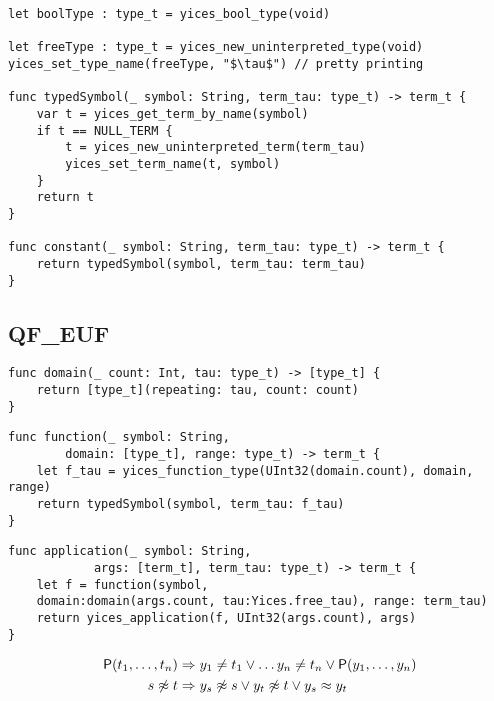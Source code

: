 \begin{lstlisting}[language=flea, caption={Yices types, symbols, and constants}]
let boolType : type_t = yices_bool_type(void)

let freeType : type_t = yices_new_uninterpreted_type(void)
yices_set_type_name(freeType, "$\tau$") // pretty printing

func typedSymbol(_ symbol: String, term_tau: type_t) -> term_t {
	var t = yices_get_term_by_name(symbol)
	if t == NULL_TERM {
		t = yices_new_uninterpreted_term(term_tau)
		yices_set_term_name(t, symbol)
	}
	return t
}

func constant(_ symbol: String, term_tau: type_t) -> term_t {
	return typedSymbol(symbol, term_tau: term_tau)
}
\end{lstlisting}




\subsection{QF\_EUF}

\begin{lstlisting}[language=flea]
func domain(_ count: Int, tau: type_t) -> [type_t] {
	return [type_t](repeating: tau, count: count)
}
\end{lstlisting}

\begin{lstlisting}[language=flea]
func function(_ symbol: String,
		domain: [type_t], range: type_t) -> term_t {
	let f_tau = yices_function_type(UInt32(domain.count), domain, range)
	return typedSymbol(symbol, term_tau: f_tau)
}
\end{lstlisting}

\begin{lstlisting}[language=flea]
func application(_ symbol: String,
			args: [term_t], term_tau: type_t) -> term_t {
	let f = function(symbol,
	domain:domain(args.count, tau:Yices.free_tau), range: term_tau)
	return yices_application(f, UInt32(args.count), args)
}
\end{lstlisting}


\begin{definition}

	\end{definition}

\begin{example}
	\begin{align*}
	\mathsf{P}(t_1,\ldots, t_n) &\Rightarrow y_1\neq t_1 \lor \ldots y_n\neq t_n \lor \mathsf{P}(y_1,\ldots,y_n) \\
	s \not\approx t &\Rightarrow y_s\not\approx s\lor y_t\not\approx t \lor y_s \approx y_t \\
	\end{align*}
	\end{example}






